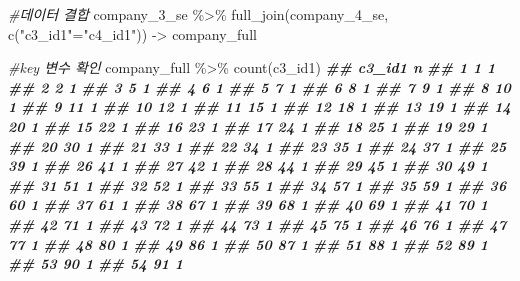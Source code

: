 \documentclass[
]{book}
\newenvironment{Shaded}{\begin{snugshade}}{\end{snugshade}}
\newcommand{\CommentTok}[1]{\textcolor[rgb]{0.56,0.35,0.01}{\textit{#1}}}
\newcommand{\DocumentationTok}[1]{\textcolor[rgb]{0.56,0.35,0.01}{\textbf{\textit{#1}}}}
\newcommand{\FunctionTok}[1]{\textcolor[rgb]{0.00,0.00,0.00}{#1}}
\newcommand{\NormalTok}[1]{#1}
\newcommand{\OtherTok}[1]{\textcolor[rgb]{0.56,0.35,0.01}{#1}}
\newcommand{\SpecialCharTok}[1]{\textcolor[rgb]{0.00,0.00,0.00}{#1}}
\newcommand{\StringTok}[1]{\textcolor[rgb]{0.31,0.60,0.02}{#1}}
\theoremstyle{definition}
\theoremstyle{definition}
\theoremstyle{definition}
\theoremstyle{definition}
\theoremstyle{remark}
\begin{document}
\begin{Shaded}
\begin{Highlighting}[]
\CommentTok{\#데이터 결합}
\NormalTok{company\_3\_se }\SpecialCharTok{\%\textgreater{}\%} 
  \FunctionTok{full\_join}\NormalTok{(company\_4\_se, }\FunctionTok{c}\NormalTok{(}\StringTok{"c3\_id1"}\OtherTok{=}\StringTok{"c4\_id1"}\NormalTok{)) }\OtherTok{{-}\textgreater{}}\NormalTok{ company\_full}

\CommentTok{\#key 변수 확인}
\NormalTok{company\_full }\SpecialCharTok{\%\textgreater{}\%} 
  \FunctionTok{count}\NormalTok{(c3\_id1)}
\DocumentationTok{\#\#     c3\_id1 n}
\DocumentationTok{\#\# 1        1 1}
\DocumentationTok{\#\# 2        2 1}
\DocumentationTok{\#\# 3        5 1}
\DocumentationTok{\#\# 4        6 1}
\DocumentationTok{\#\# 5        7 1}
\DocumentationTok{\#\# 6        8 1}
\DocumentationTok{\#\# 7        9 1}
\DocumentationTok{\#\# 8       10 1}
\DocumentationTok{\#\# 9       11 1}
\DocumentationTok{\#\# 10      12 1}
\DocumentationTok{\#\# 11      15 1}
\DocumentationTok{\#\# 12      18 1}
\DocumentationTok{\#\# 13      19 1}
\DocumentationTok{\#\# 14      20 1}
\DocumentationTok{\#\# 15      22 1}
\DocumentationTok{\#\# 16      23 1}
\DocumentationTok{\#\# 17      24 1}
\DocumentationTok{\#\# 18      25 1}
\DocumentationTok{\#\# 19      29 1}
\DocumentationTok{\#\# 20      30 1}
\DocumentationTok{\#\# 21      33 1}
\DocumentationTok{\#\# 22      34 1}
\DocumentationTok{\#\# 23      35 1}
\DocumentationTok{\#\# 24      37 1}
\DocumentationTok{\#\# 25      39 1}
\DocumentationTok{\#\# 26      41 1}
\DocumentationTok{\#\# 27      42 1}
\DocumentationTok{\#\# 28      44 1}
\DocumentationTok{\#\# 29      45 1}
\DocumentationTok{\#\# 30      49 1}
\DocumentationTok{\#\# 31      51 1}
\DocumentationTok{\#\# 32      52 1}
\DocumentationTok{\#\# 33      55 1}
\DocumentationTok{\#\# 34      57 1}
\DocumentationTok{\#\# 35      59 1}
\DocumentationTok{\#\# 36      60 1}
\DocumentationTok{\#\# 37      61 1}
\DocumentationTok{\#\# 38      67 1}
\DocumentationTok{\#\# 39      68 1}
\DocumentationTok{\#\# 40      69 1}
\DocumentationTok{\#\# 41      70 1}
\DocumentationTok{\#\# 42      71 1}
\DocumentationTok{\#\# 43      72 1}
\DocumentationTok{\#\# 44      73 1}
\DocumentationTok{\#\# 45      75 1}
\DocumentationTok{\#\# 46      76 1}
\DocumentationTok{\#\# 47      77 1}
\DocumentationTok{\#\# 48      80 1}
\DocumentationTok{\#\# 49      86 1}
\DocumentationTok{\#\# 50      87 1}
\DocumentationTok{\#\# 51      88 1}
\DocumentationTok{\#\# 52      89 1}
\DocumentationTok{\#\# 53      90 1}
\DocumentationTok{\#\# 54      91 1}

\end{Highlighting}
\end{Shaded}
\end{document}
